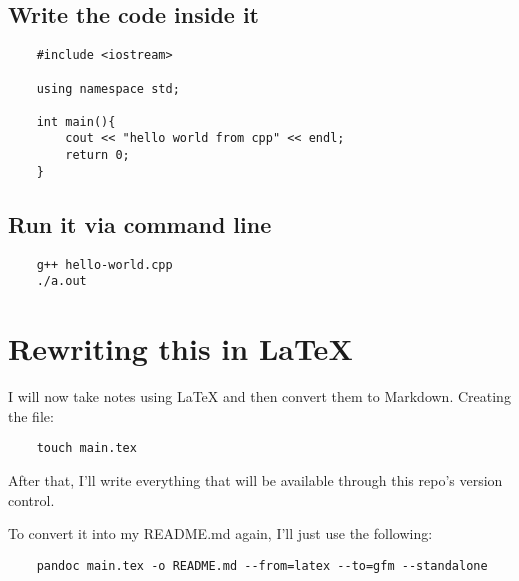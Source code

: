 \documentclass{article}
\begin{document}
\subsection{Write the code inside it}
\begin{verbatim}
    #include <iostream>

    using namespace std;

    int main(){
        cout << "hello world from cpp" << endl;
        return 0;
    }
\end{verbatim}

\subsection{Run it via command line}
\begin{verbatim}
    g++ hello-world.cpp
    ./a.out 
\end{verbatim}

\section{Rewriting this in \LaTeX}
I will now take notes using \LaTeX{} and then convert them to Markdown. Creating the file:

\begin{verbatim}
    touch main.tex
\end{verbatim}

After that, I'll write everything that will be available through this repo's version control.

To convert it into my README.md again, I'll just use the following:
\begin{verbatim}
    pandoc main.tex -o README.md --from=latex --to=gfm --standalone
\end{verbatim}



\end{document}
